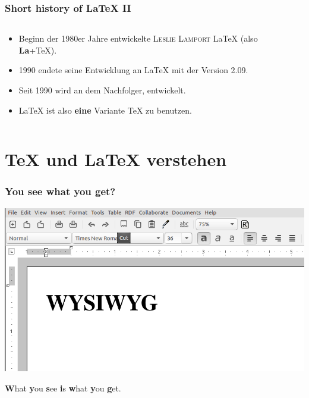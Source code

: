 \begin{frame}\frametitle{Short history of \LaTeX{} II}

  \begin{columns}
    \begin{column}{0.7\linewidth}
      \begin{itemize}
      \item<1-> Beginn der 1980er Jahre entwickelte \textsc{Leslie
          Lamport} \LaTeX{} (also \textbf{La}+\TeX{}).
      \item<2-> 1990 endete seine Entwicklung an \LaTeX{} mit der Version 2.09.
      \item<3-> Seit 1990 wird an dem Nachfolger, \LaTeXe{} entwickelt.
      \item<4-> \LaTeX{} ist also \textbf{eine} Variante \TeX{} zu benutzen.
      \end{itemize}
    \end{column}
    \begin{column}{0.3\linewidth}
    \end{column}
  \end{columns}
\end{frame}

\section{\TeX{} und \LaTeX{} verstehen}

\begin{frame}
  \frametitle{You see what you get?}
  \includegraphics[width=\textwidth]{pics/wysiwyg.png}

  \textbf What \textbf you \textbf see \textbf is \textbf what \textbf you \textbf get.
\end{frame}

